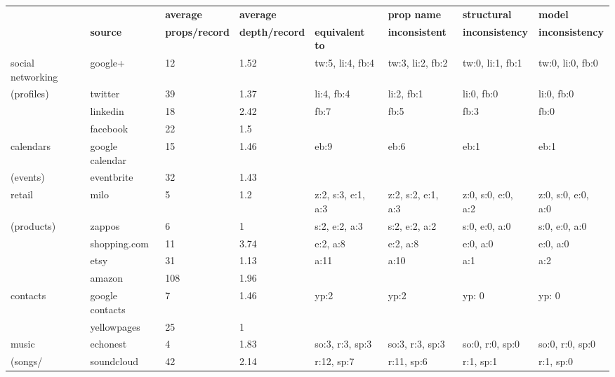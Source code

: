 \documentclass{sigchi}
\begin{document}
\begin{table}[htb]
\small
\begin{tabular}{p{2.0cm}  p{1.8cm}  p{1.8cm}  p{1.8cm}  p{1.8cm}  p{1.8cm}  p{1.8cm}  p{1.8cm}}
				&				& {\bf average}				& {\bf average }				& 				& {\bf prop name}			& {\bf structural} 			& {\bf model } \\
				& {\bf source}		& {\bf props/record}			& {\bf depth/record}			& {\bf equivalent to}	& {\bf inconsistent}			& {\bf inconsistency} 			& {\bf inconsistency} \\
\hline
social networking	& google+			& 12						& 1.52					& tw:5, li:4, fb:4		& tw:3, li:2, fb:2				& tw:0, li:1, fb:1				& tw:0, li:0, fb:0 \\
(profiles)			& twitter			& 39						& 1.37					& li:4, fb:4 			& li:2, fb:1					& li:0, fb:0					& li:0, fb:0 \\
				& linkedin			& 18						& 2.42					& fb:7			& fb:5					& fb:3					& fb:0 \\
				& facebook		& 22						& 1.5						&				&						&						& \\
\hline
calendars			& google calendar	& 15						& 1.46					& eb:9			& eb:6					& eb:1					& eb:1 \\
(events)			& eventbrite		& 32						& 1.43					&				&						& 						& \\
\hline
retail				& milo			& 5						& 1.2						& z:2, s:3, e:1, a:3	& z:2, s:2, e:1, a:3			& z:0, s:0, e:0, a:2			& z:0, s:0, e:0, a:0 \\
(products)			& zappos			& 6						& 1						& s:2, e:2, a:3		& s:2, e:2, a:2				& s:0, e:0, a:0				& s:0, e:0, a:0 \\
				& shopping.com	& 11						& 3.74					& e:2, a:8			& e:2, a:8					& e:0, a:0					& e:0, a:0 \\
				& etsy			& 31						& 1.13					& a:11			& a:10					& a:1						& a:2 \\
				& amazon			& 108					& 1.96					&				& 						&						& \\
\hline
contacts			& google contacts	& 7						& 1.46					& yp:2			& yp:2					& yp: 0					& yp: 0 \\
				& yellowpages		& 25						& 1						&				&						&						& \\
\hline
music			& echonest		& 4						& 1.83					& so:3, r:3, sp:3		& so:3, r:3, sp:3				& so:0, r:0, sp:0				& so:0, r:0, sp:0 \\
(songs/			& soundcloud		& 42						& 2.14					& r:12, sp:7		& r:11, sp:6 				& r:1, sp:1					& r:1, sp:0 \\

\end{tabular}
\end{table}
\end{document}
